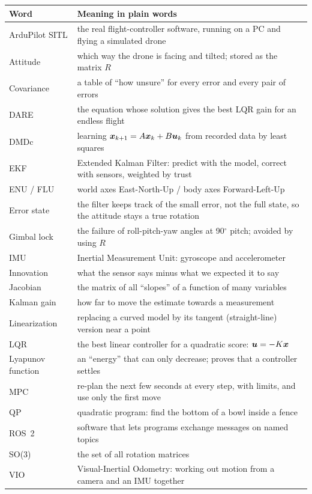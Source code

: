 \begin{center}\small
\begin{tabularx}{\linewidth}{@{}l X@{}}
\toprule
\textbf{Word} & \textbf{Meaning in plain words}\\
\midrule
ArduPilot SITL & the real flight-controller software, running on a PC and flying a simulated drone\\
Attitude & which way the drone is facing and tilted; stored as the matrix $R$\\
Covariance & a table of ``how unsure'' for every error and every pair of errors\\
DARE & the equation whose solution gives the best LQR gain for an endless flight\\
DMDc & learning $\bm{x}_{k+1}=A\bm{x}_k+B\bm{u}_k$ from recorded data by least squares\\
EKF & Extended Kalman Filter: predict with the model, correct with sensors, weighted by trust\\
ENU / FLU & world axes East-North-Up / body axes Forward-Left-Up\\
Error state & the filter keeps track of the small error, not the full state, so the attitude stays a true rotation\\
Gimbal lock & the failure of roll-pitch-yaw angles at 90$^\circ$ pitch; avoided by using $R$\\
IMU & Inertial Measurement Unit: gyroscope and accelerometer\\
Innovation & what the sensor says minus what we expected it to say\\
Jacobian & the matrix of all ``slopes'' of a function of many variables\\
Kalman gain & how far to move the estimate towards a measurement\\
Linearization & replacing a curved model by its tangent (straight-line) version near a point\\
LQR & the best linear controller for a quadratic score: $\bm{u}=-K\bm{x}$\\
Lyapunov function & an ``energy'' that can only decrease; proves that a controller settles\\
MPC & re-plan the next few seconds at every step, with limits, and use only the first move\\
QP & quadratic program: find the bottom of a bowl inside a fence\\
ROS~2 & software that lets programs exchange messages on named topics\\
SO(3) & the set of all rotation matrices\\
VIO & Visual-Inertial Odometry: working out motion from a camera and an IMU together\\
\bottomrule
\end{tabularx}
\end{center}

